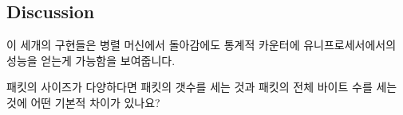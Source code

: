 \subsection{Discussion}

이 세개의 구현들은 병렬 머신에서 돌아감에도 통계적 카운터에 유니프로세서에서의
성능을 얻는게 가능함을 보여줍니다.

\QuickQuiz{}
	패킷의 사이즈가 다양하다면 패킷의 갯수를 세는 것과 패킷의 전체 바이트
	수를 세는 것에 어떤 기본적 차이가 있나요?

